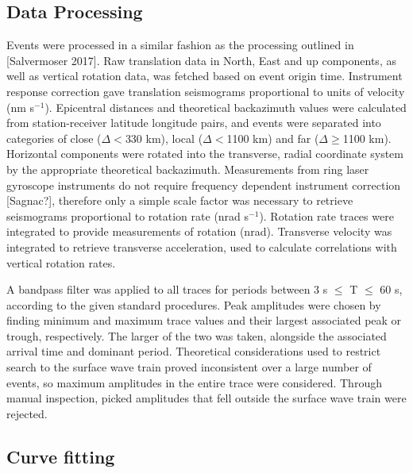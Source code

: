 \documentclass{gji}
\begin{document}
\subsection{Data Processing}\label{sec:dataproc}
Events were processed in a similar fashion as the processing outlined in [Salvermoser 2017]. %
Raw translation data in North, East and up components, as well as vertical rotation data, was fetched based on event origin time. Instrument response correction gave translation seismograms proportional to units of velocity (nm s$^{-1}$). Epicentral distances and theoretical backazimuth values were calculated from station-receiver latitude longitude pairs, and events were separated into categories of close ($\Delta <$330 km), local ($\Delta <$1100 km) and far ($\Delta \ge$1100 km). Horizontal components were rotated into the transverse, radial coordinate system by the appropriate theoretical backazimuth. Measurements from ring laser gyroscope instruments do not require frequency dependent instrument correction [Sagnac?], %
therefore only a simple scale factor was necessary to retrieve seismograms proportional to rotation rate (nrad s$^{-1}$). Rotation rate traces were integrated to provide measurements of rotation (nrad). Transverse velocity was integrated to retrieve transverse acceleration, used to calculate correlations with vertical rotation rates.

A bandpass filter was applied to all traces for periods between 3 s $\le$ T $\le$ 60 s, according to the given standard procedures. Peak amplitudes were chosen by finding minimum and maximum trace values and their largest associated peak or trough, respectively. The larger of the two was taken, alongside the associated arrival time and dominant period. Theoretical considerations used to restrict search to the surface wave train proved inconsistent over a large number of events, so maximum amplitudes in the entire trace were considered. Through manual inspection, picked amplitudes that fell outside the surface wave train were rejected. 

\subsection{Curve fitting}
\end{document}
